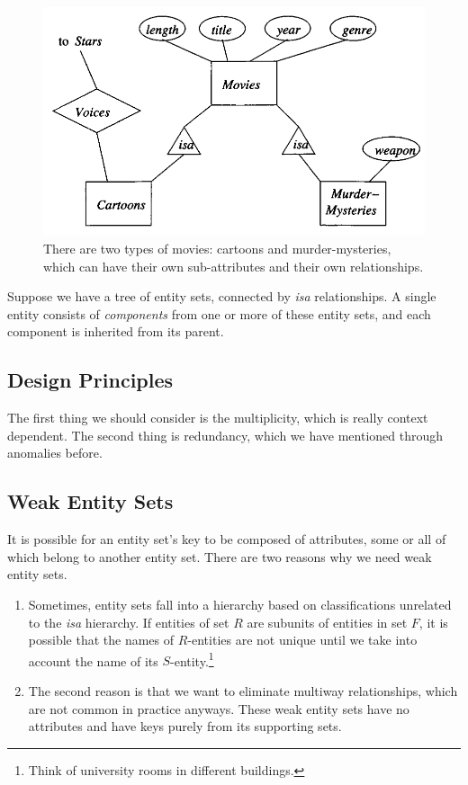 \documentclass{article}
\begin{document}
      \begin{figure}[H]
        \centering 
        \includegraphics[scale=0.4]{img/isa.png}
        \caption{There are two types of movies: cartoons and murder-mysteries, which can have their own sub-attributes and their own relationships.} 
        \label{fig:isa}
      \end{figure}

      Suppose we have a tree of entity sets, connected by \textit{isa} relationships. A single entity consists of \textit{components} from one or more of these entity sets, and each component is inherited from its parent. 

  \subsection{Design Principles} 

    The first thing we should consider is the multiplicity, which is really context dependent. The second thing is redundancy, which we have mentioned through anomalies before.  

  \subsection{Weak Entity Sets}

    It is possible for an entity set's key to be composed of attributes, some or all of which belong to another entity set. There are two reasons why we need weak entity sets. 
    \begin{enumerate}
      \item Sometimes, entity sets fall into a hierarchy based on classifications unrelated to the \textit{isa} hierarchy. If entities of set $R$ are subunits of entities in set $F$, it is possible that the names of $R$-entities are not unique until we take into account the name of its $S$-entity.\footnote{Think of university rooms in different buildings.}
      \item The second reason is that we want to eliminate multiway relationships, which are not common in practice anyways. These weak entity sets have no attributes and have keys purely from its supporting sets. 
    \end{enumerate}
\end{document}
